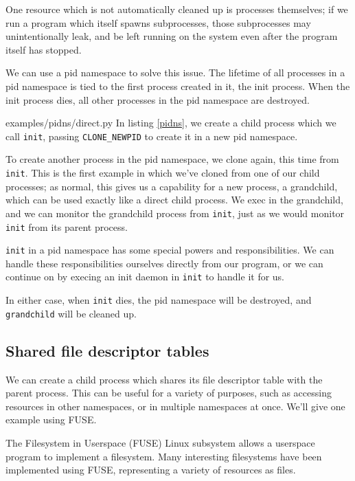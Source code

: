 \documentclass[letterpaper,twocolumn,10pt]{article}
\begin{document}
One resource which is not automatically cleaned up is processes themselves;
if we run a program which itself spawns subprocesses,
those subprocesses may unintentionally leak,
and be left running on the system even after the program itself has stopped.\cite{caternfork}

We can use a pid namespace to solve this issue.
The lifetime of all processes in a pid namespace is tied to the first process created in it,
the init process.
When the init process dies,
all other processes in the pid namespace are destroyed.\cite{pid_namespaces}


{examples/pidns/direct.py}
In listing \ref{pidns},
we create a child process which we call \texttt{init},
passing \verb|CLONE_NEWPID| to create it in a new pid namespace.\cite{clone}

To create another process in the pid namespace,
we clone again, this time from \texttt{init}.
This is the first example in which we've cloned from one of our child processes;
as normal, this gives us a capability for a new process, a grandchild,
which can be used exactly like a direct child process.
We exec in the grandchild,
and we can monitor the grandchild process from \texttt{init},
just as we would monitor \texttt{init} from its parent process.

\texttt{init} in a pid namespace has some special powers and responsibilities.
We can handle these responsibilities ourselves directly from our program,
or we can continue on by execing an init daemon in \texttt{init} to handle it for us.
\cite{pid_namespaces}\cite{tini}\cite{dumb_init}

In either case, when \texttt{init} dies,
the pid namespace will be destroyed,
and \texttt{grandchild} will be cleaned up.
\subsection{Shared file descriptor tables}\label{shared_fd_table}
We can create a child process which shares its file descriptor table with the parent process.
This can be useful for a variety of purposes,
such as accessing resources in other namespaces, or in multiple namespaces at once.
We'll give one example using FUSE.

The Filesystem in Userspace (FUSE) Linux subsystem allows a userspace program
to implement a filesystem.\cite{fuse}
Many interesting filesystems have been implemented using FUSE,
representing a variety of resources as files.\cite{sshfs}\cite{encfs}\cite{mp3fs}
\end{document}
